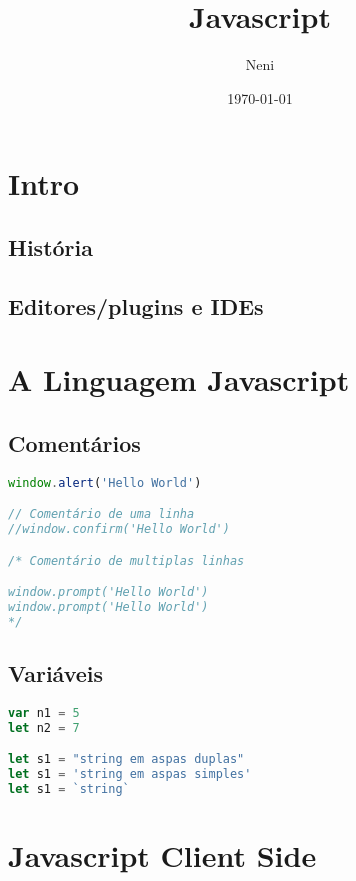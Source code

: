 \documentclass{apostila}
\title{Javascript}
\author{Neni}
\date{\today}
\begin{document}
\chapter{Intro}
\section{História}
\section{Editores/plugins e IDEs}




\chapter{A Linguagem Javascript}
\section{Comentários}
\begin{lstlisting}[language=js,caption=Comentários]
window.alert('Hello World')

// Comentário de uma linha
//window.confirm('Hello World')

/* Comentário de multiplas linhas

window.prompt('Hello World')
window.prompt('Hello World')
*/
\end{lstlisting} \cite[5]{cev}

\section{Variáveis}
\begin{lstlisting}[language=js,caption=Comentários]
var n1 = 5
let n2 = 7

let s1 = "string em aspas duplas"
let s1 = 'string em aspas simples'
let s1 = `string`
\end{lstlisting} \cite[5]{cev}





\chapter{Javascript Client Side}


\end{document}
